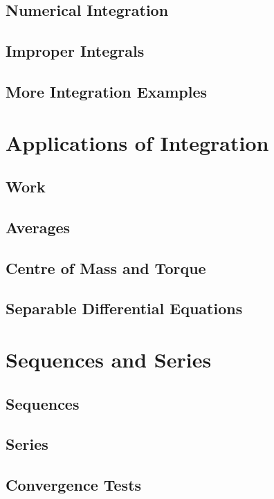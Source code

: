 \documentclass[12pt,letterpaper, openany]{book}
\begin{document}
\section{Numerical Integration}

\section{Improper Integrals}

\section{More Integration Examples}


\chapter{Applications of Integration}
\section{Work}

\section{Averages}

\section{Centre of Mass and Torque}

\section{Separable Differential Equations}


\chapter{Sequences and Series}
\section{Sequences}

\section{Series}

\section{Convergence Tests}

\end{document}
